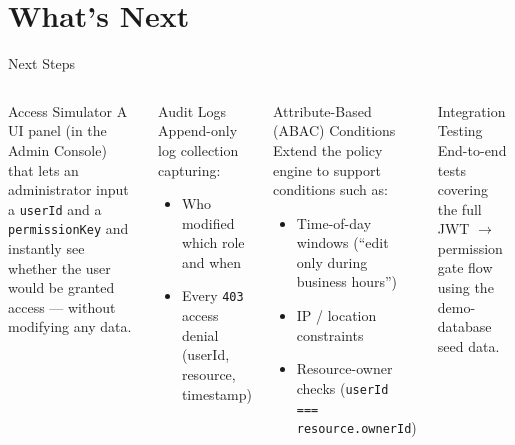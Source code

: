\documentclass[aspectratio=169]{beamer}
\begin{document}
\section{What's Next}
\begin{frame}{Next Steps}
  \begin{columns}[t]
    \begin{block}{Access Simulator}
      A UI panel (in the Admin Console) that lets an administrator input a
      \texttt{userId} and a \texttt{permissionKey} and instantly see whether
      the user would be granted access --- without modifying any data.
    \end{block}
    \vspace{0.3cm}
    \begin{block}{Audit Logs}
      Append-only log collection capturing:
      \begin{itemize}
        \item Who modified which role and when
        \item Every \texttt{403} access denial (userId, resource, timestamp)
      \end{itemize}
    \end{block}

    \begin{block}{Attribute-Based (ABAC) Conditions}
      Extend the policy engine to support conditions such as:
      \begin{itemize}
        \item Time-of-day windows (``edit only during business hours'')
        \item IP / location constraints
        \item Resource-owner checks (\texttt{userId === resource.ownerId})
      \end{itemize}
    \end{block}
    \vspace{0.3cm}
    \begin{block}{Integration Testing}
      End-to-end tests covering the full JWT $\to$ permission gate flow using
      the demo-database seed data.
    \end{block}
  \end{columns}
\end{frame}
\end{document}
